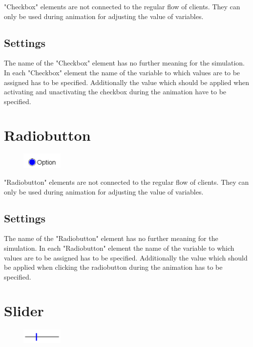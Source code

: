 "Checkbox" elements are not connected to the regular flow of clients.
They can only be used during animation for adjusting the value of
variables.

\subsection*{Settings}

The name of the "Checkbox" element has no further meaning for the simulation.
In each "Checkbox" element the name of the variable to which values are to
be assigned has to be specified. Additionally the value which should be
applied when activating and unactivating the checkbox during the animation
have to be specified.  


\section{Radiobutton}
\label{ref:ModelElementInteractiveRadiobutton}

\begin{figure}
\vspace{-22pt}
\includegraphics[width=2cm]{imageModelElementInteractiveRadiobutton.png}
\vspace{-22pt}
\end{figure}

"Radiobutton" elements are not connected to the regular flow of clients.
They can only be used during animation for adjusting the value of
variables.

\subsection*{Settings}

The name of the "Radiobutton" element has no further meaning for the simulation.
In each "Radiobutton" element the name of the variable to which values are to
be assigned has to be specified. Additionally the value which should be
applied when clicking the radiobutton during the animation has to be specified.  


\section{Slider}
\label{ref:ModelElementInteractiveSlider}

\begin{figure}
\vspace{-22pt}
\includegraphics[width=2cm]{imageModelElementInteractiveSlider.png}
\vspace{-22pt}
\end{figure}

